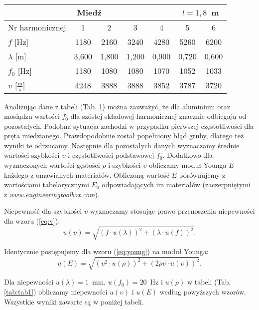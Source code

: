 \documentclass[12pt,a4paper]{article}
\numberwithin{equation}{section}
\begin{document}
\begin{table}[!ht]
\begin{adjustbox}{height=0.448\textheight}
\begin{center}
\begin{tabular}{l||c|c|c|c|c|c}
				\multicolumn{5}{c}{\hspace{3.25cm}\bfseries Miedź} & \multicolumn{2}{c}{$l = 1,8$~m} \\ \hline
				Nr harmonicznej & 1 & 2 & 3 & 4 & 5 & 6  \\
				$f$ [Hz] & 1180 & 2160 & 3240 & 4280 & 5260 & 6200  \\
				$\lambda$ [m] & 3,600 & 1,800 & 1,200 & 0,900 & 0,720 & 0,600  \\ 
				$f_0$ [Hz] & 1180 & 1080 & 1080 & 1070 & 1052 & 1033  \\
				$\upsilon$ $\Big[\frac{\textrm{m}}{\textrm{s}}\Big]$ & 4248 & 3888 & 3888 & 3852 & 3787 & 3720 \\ \hline
			\end{tabular}
		\end{center}
	\end{adjustbox}
	\label{tab:tab2}
\end{table}
\pagebreak

Analizując dane z tabeli (Tab. \ref{tab:tab2}) można zauważyć, że dla aluminium oraz mosiądzu wartości $f_0$ dla szóstej składowej harmonicznej znacznie odbiegają od pozostałych. Podobna sytuacja zachodzi w przypadku pierwszej częstotliwości dla pręta miedzianego. Prawdopodobnie został popełniony błąd gruby, dlatego też wyniki te odrzucamy. Następnie dla pozostałych danych wyznaczamy średnie wartości szybkości $\upsilon$ i częstotliwości podstawowej $f_0$. Dodatkowo dla wyznaczonych wartości gęstości $\rho$ i szybkości $\upsilon$ obliczamy moduł Younga $E$ każdego z omawianych materiałów. Obliczoną wartość $E$ porównujemy z wartościami tabelarycznymi $E_0$ odpowiadających im materiałów (zaczerpniętymi z \emph{www.engineeringtoolbox.com}).

Niepewność dla szybkości $\upsilon$ wyznaczamy stosując prawo przenoszenia niepewności dla wzoru (\ref{eq:v}):
\begin{equation}
u(\upsilon) = \sqrt{(f \cdot u(\lambda))^2 + (\lambda \cdot u(f))^2}.
\end{equation}

Identycznie postępujemy dla wzoru (\ref{eq:young}) na moduł Younga:
\begin{equation}
u(E) = \sqrt{(\upsilon^2 \cdot u(\rho))^2 + (2\rho\upsilon \cdot u(\upsilon))^2}.
\end{equation}

Dla niepewności $u(\lambda) = 1$~mm, $u(f_0) = 20$~Hz i $u(\rho)$ w tabeli (Tab. \ref{tab:tab1}) obliczamy niepewności $u(\upsilon)$ i $u(E)$ według powyższych wzorów. Wszystkie wyniki zawarte są w poniżej tabeli.
\end{document}
